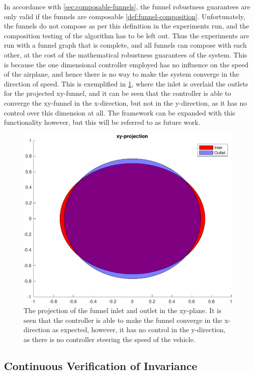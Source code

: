 In accordance with \cref{sec:composable-funnels}, the funnel robustness
guarantees are only valid if the funnels are composable 
\cref{def:funnel-composition}. Unfortunately, the funnels do not
compose as per this definition in the experiments run, and the composition
testing of the algorithm has to be left out. Thus the experiments are run with a
funnel graph that is complete, and all funnels can compose with each other, at
the cost of the mathematical robustness guarantees of the system. This is
because the one dimensional controller employed has no influence on the speed of
the airplane, and hence there is no way to make the system converge in the
direction of speed. This is exemplified in \cref{fig:funnel-inlet-outlet}, where
the inlet is overlaid the outlets for the projected xy-funnel, and it can be
seen that the controller is able to converge the xy-funnel in the x-direction,
but not in the y-direction, as it has no control over this dimension at all. The
framework can be expanded with this functionality however, but this will be
referred to as future work.

\begin{figure}[!t]
  \centering
  \includegraphics[width=.8\columnwidth]{figures/experiments/funnel-inlet-outlet}
  \caption[The projection of the funnel inlet and outlet in the xy-plane]{The projection of the funnel inlet and outlet in the xy-plane. It is
    seen that the controller is able to make the funnel converge in the
    x-direction as expected, however, it has no control in the y-direction, as
    there is no controller steering the speed of the vehicle.}
  \label{fig:funnel-inlet-outlet}
\end{figure}

\subsection{Continuous Verification of Invariance}
\label{subsec:check-vehicle-in-funnel}

